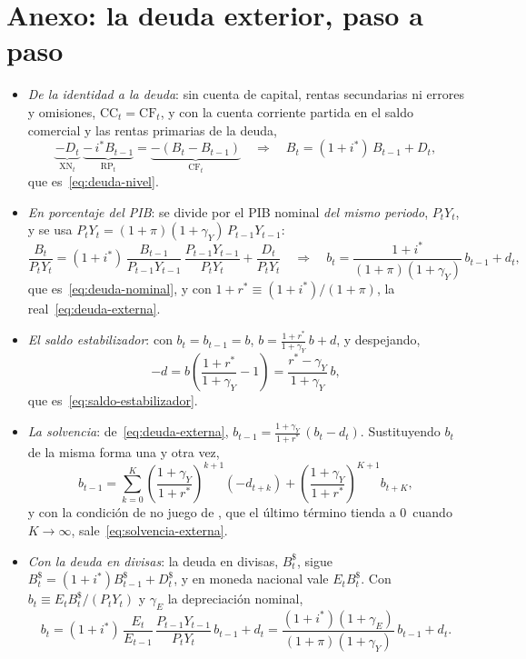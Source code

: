 \documentclass[11pt]{article}
\begin{document}
\section{Anexo: la deuda exterior, paso a paso}\label{anexo:sostenibilidad}

\begin{itemize}
\item \emph{De la identidad a la deuda}: sin cuenta de capital, rentas secundarias ni errores y omisiones, $\mathrm{CC}_t=\mathrm{CF}_t$, y con la cuenta corriente partida en el saldo comercial y las rentas primarias de la deuda,
  \[
  \underbrace{-D_t}_{\mathrm{XN}_t}\;\underbrace{-\,i^*B_{t-1}}_{\mathrm{RP}_t}=\underbrace{-(B_t-B_{t-1})}_{\mathrm{CF}_t}
  \quad\Longrightarrow\quad B_t=(1+i^*)\,B_{t-1}+D_t ,
  \]
  que es~\eqref{eq:deuda-nivel}.
\item \emph{En porcentaje del PIB}: se divide por el PIB nominal \emph{del mismo periodo}, $P_tY_t$, y se usa $P_tY_t=(1+\pi)(1+\gamma_Y)\,P_{t-1}Y_{t-1}$:
  \[
  \frac{B_t}{P_tY_t}=(1+i^*)\,\frac{B_{t-1}}{P_{t-1}Y_{t-1}}\,\frac{P_{t-1}Y_{t-1}}{P_tY_t}+\frac{D_t}{P_tY_t}
  \quad\Longrightarrow\quad b_t=\frac{1+i^*}{(1+\pi)(1+\gamma_Y)}\,b_{t-1}+d_t ,
  \]
  que es~\eqref{eq:deuda-nominal}, y con $1+r^*\equiv(1+i^*)/(1+\pi)$, la real~\eqref{eq:deuda-externa}. \findemo
\item \emph{El saldo estabilizador}: con $b_t=b_{t-1}=b$, $b=\frac{1+r^*}{1+\gamma_Y}\,b+d$, y despejando,
  \[
  -d=b\left(\frac{1+r^*}{1+\gamma_Y}-1\right)=\frac{r^*-\gamma_Y}{1+\gamma_Y}\,b ,
  \]
  que es~\eqref{eq:saldo-estabilizador}. \findemo
\item \emph{La solvencia}: de~\eqref{eq:deuda-externa}, $b_{t-1}=\frac{1+\gamma_Y}{1+r^*}\,(b_t-d_t)$. Sustituyendo $b_t$ de la misma forma una y otra vez,
  \[
  b_{t-1}=\sum_{k=0}^{K}\left(\frac{1+\gamma_Y}{1+r^*}\right)^{k+1}(-d_{t+k})+\left(\frac{1+\gamma_Y}{1+r^*}\right)^{K+1}b_{t+K},
  \]
  y con la condición de no juego de , que el último término tienda a 0~cuando $K\to\infty$, sale~\eqref{eq:solvencia-externa}. \findemo
\item \emph{Con la deuda en divisas}: la deuda en divisas, $B^{\$}_t$, sigue $B^{\$}_t=(1+i^*)B^{\$}_{t-1}+D^{\$}_t$, y en moneda nacional vale $E_tB^{\$}_t$. Con $b_t\equiv E_tB^{\$}_t/(P_tY_t)$ y $\gamma_E$ la depreciación nominal,
  \[
  b_t=(1+i^*)\,\frac{E_t}{E_{t-1}}\,\frac{P_{t-1}Y_{t-1}}{P_tY_t}\,b_{t-1}+d_t=\frac{(1+i^*)(1+\gamma_E)}{(1+\pi)(1+\gamma_Y)}\,b_{t-1}+d_t .
\]
\end{itemize}
\end{document}
